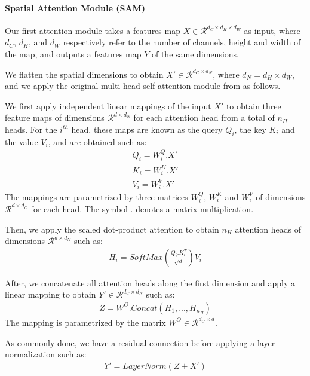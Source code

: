 \paragraph{Spatial Attention Module (SAM)}

Our first attention module takes a features map $X \in \mathcal{R}^{d_C \times d_H \times d_W}$ as input, where $d_C$, $d_H$, and $d_W$ respectively  refer to the number of channels, height and width of the map, and outputs a features map $Y$ of the same dimensions.

We flatten the spatial dimensions to obtain $X' \in \mathcal{R}^{d_C \times d_N}$, where $d_N = d_H \times d_W$, and we apply the original multi-head self-attention module from \citet{vaswani2017attention} as follows.

We first apply independent linear mappings of the input $X'$ to obtain three feature maps of dimensions $\mathcal{R}^{d \times d_N}$ for each attention head from a total of $n_H$ heads. For the $i^{th}$ head, these maps are known as the query $Q_i$, the key $K_i$ and the value $V_i$, and are obtained such as:
\begin{align*}
Q_i = W^Q_i . X' \\
K_i = W^K_i . X' \\
V_i = W^V_i . X'
\end{align*}
The mappings are parametrized by three matrices $W^Q_i$, $W^K_i$ and $W^V_i$ of dimensions $\mathcal{R}^{d \times d_C}$ for each head. The symbol $.$ denotes a matrix multiplication.

Then, we apply the scaled dot-product attention \citep{vaswani2017attention} to obtain $n_H$ attention heads of dimensions $\mathcal{R}^{d \times d_N}$ such as:
\begin{align}
    H_i = SoftMax(\frac{Q_i . K_i^T}{\sqrt{d}}) V_i
\end{align}

After, we concatenate all attention heads along the first dimension and apply a linear mapping to obtain $Y' \in \mathcal{R}^{d_C \times d_N}$ such as:
\begin{align}
    Z = W^O . Concat(H_1, ..., H_{n_H}) 
\end{align}
The mapping is parametrized by the matrix $W^O \in \mathcal{R}^{d_C \times d}$.

As commonly done, we have a residual connection before applying a layer normalization \citep{ba2016layer} such as:
\begin{align}
    Y' = LayerNorm(Z + X')
\end{align}

